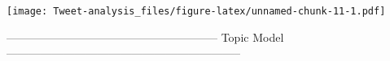 \documentclass[
]{article}
\newenvironment{Shaded}{\begin{snugshade}}{\end{snugshade}}
\newcommand{\DataTypeTok}[1]{\textcolor[rgb]{0.13,0.29,0.53}{#1}}
\newcommand{\DecValTok}[1]{\textcolor[rgb]{0.00,0.00,0.81}{#1}}
\newcommand{\FloatTok}[1]{\textcolor[rgb]{0.00,0.00,0.81}{#1}}
\newcommand{\KeywordTok}[1]{\textcolor[rgb]{0.13,0.29,0.53}{\textbf{#1}}}
\newcommand{\NormalTok}[1]{#1}
\newcommand{\OperatorTok}[1]{\textcolor[rgb]{0.81,0.36,0.00}{\textbf{#1}}}
\newcommand{\StringTok}[1]{\textcolor[rgb]{0.31,0.60,0.02}{#1}}
\begin{document}
\begin{Shaded}
\end{Shaded}

\texttt{[image: Tweet-analysis\_files/figure-latex/unnamed-chunk-11-1.pdf]}

-------------------------------------------------------- Topic Model
--------------------------------------------------------------
\end{document}
